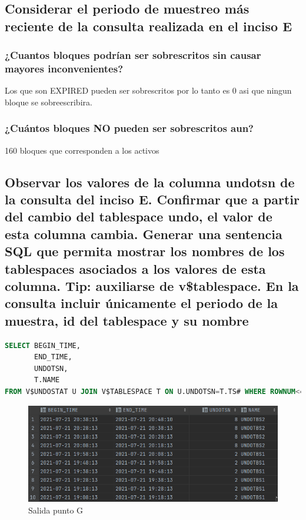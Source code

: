 \documentclass[journal]{IEEEtran}
\begin{document}
\subsection{Considerar el periodo de muestreo más reciente de la consulta realizada en el inciso E}
\subsubsection{¿Cuantos bloques podrían ser sobrescritos sin causar mayores inconvenientes?}
Los que son EXPIRED pueden ser sobrescritos por lo tanto es 0 asi que ningun bloque se sobreescribira.
\subsubsection{¿Cuántos bloques NO pueden ser sobrescritos aun?}
160 bloques que corresponden a los activos

\subsection{Observar los valores de la columna undotsn de la consulta del inciso E. Confirmar 
que a partir del cambio del tablespace undo, el valor de esta columna cambia. Generar una sentencia 
SQL que permita mostrar los nombres de los tablespaces asociados a los valores de esta columna. 
Tip: auxiliarse de v\$tablespace. En la consulta incluir únicamente el periodo de la muestra, id del tablespace y su nombre}
\begin{lstlisting}[language=sql, caption=sentencia consulta tablespace id-nombre,label={lst:codigo3}]
SELECT BEGIN_TIME,
       END_TIME,
       UNDOTSN,
       T.NAME
FROM V$UNDOSTAT U JOIN V$TABLESPACE T ON U.UNDOTSN=T.TS# WHERE ROWNUM<=20 ORDER BY BEGIN_TIME DESC;
\end{lstlisting}
\begin{figure}[H]
  \centering
  \includegraphics[scale=.30]{captura_4.png}
   \caption{Salida punto G}
   \label{fig:validador_4}
\end{figure}
\end{document}
